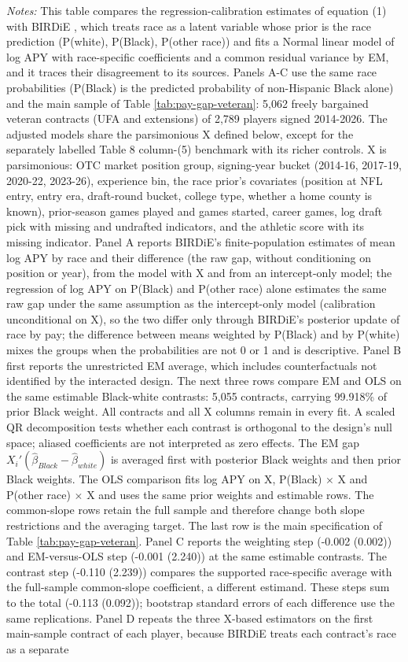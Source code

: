 {\footnotesize
\noindent\textit{Notes:} This table compares the regression-calibration estimates of equation (1) with BIRDiE \citep{mccartan2025birdie}, which treats race as a latent variable whose prior is the race prediction (P(white), P(Black), P(other race)) and fits a Normal linear model of log APY with race-specific coefficients and a common residual variance by EM, and it traces their disagreement to its sources. Panels A-C use the same race probabilities (P(Black) is the predicted probability of non-Hispanic Black alone) and the main sample of Table \ref{tab:pay-gap-veteran}: 5,062 freely bargained veteran contracts (UFA and extensions) of 2,789 players signed 2014-2026. The adjusted models share the parsimonious X defined below, except for the separately labelled Table 8 column-(5) benchmark with its richer controls. X is parsimonious: OTC market position group, signing-year bucket (2014-16, 2017-19, 2020-22, 2023-26), experience bin, the race prior's covariates (position at NFL entry, entry era, draft-round bucket, college type, whether a home county is known), prior-season games played and games started, career games, log draft pick with missing and undrafted indicators, and the athletic score with its missing indicator. Panel A reports BIRDiE's finite-population estimates of mean log APY by race and their difference (the raw gap, without conditioning on position or year), from the model with X and from an intercept-only model; the regression of log APY on P(Black) and P(other race) alone estimates the same raw gap under the same assumption as the intercept-only model (calibration unconditional on X), so the two differ only through BIRDiE's posterior update of race by pay; the difference between means weighted by P(Black) and by P(white) mixes the groups when the probabilities are not 0 or 1 and is descriptive. Panel B first reports the unrestricted EM average, which includes counterfactuals not identified by the interacted design. The next three rows compare EM and OLS on the same estimable Black-white contrasts: 5,055 contracts, carrying 99.918\% of prior Black weight. All contracts and all X columns remain in every fit. A scaled QR decomposition tests whether each contrast is orthogonal to the design's null space; aliased coefficients are not interpreted as zero effects. The EM gap $X_i'(\hat\beta_{Black}-\hat\beta_{white})$ is averaged first with posterior Black weights and then prior Black weights. The OLS comparison fits log APY on X, P(Black) $\times$ X and P(other race) $\times$ X and uses the same prior weights and estimable rows. The common-slope rows retain the full sample and therefore change both slope restrictions and the averaging target. The last row is the main specification of Table \ref{tab:pay-gap-veteran}. Panel C reports the weighting step (-0.002 (0.002)) and EM-versus-OLS step (-0.001 (2.240)) at the same estimable contrasts. The contrast step (-0.110 (2.239)) compares the supported race-specific average with the full-sample common-slope coefficient, a different estimand. These steps sum to the total (-0.113 (0.092)); bootstrap standard errors of each difference use the same replications. Panel D repeats the three X-based estimators on the first main-sample contract of each player, because BIRDiE treats each contract's race as a separate }
